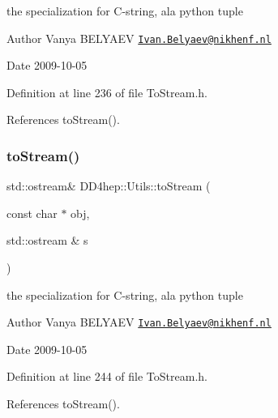 the specialization for C-\/string, a\textquotesingle{}la python tuple \begin{DoxyAuthor}{Author}
Vanya B\+E\+L\+Y\+A\+EV \href{mailto:Ivan.Belyaev@nikhenf.nl}{\tt Ivan.\+Belyaev@nikhenf.\+nl} 
\end{DoxyAuthor}
\begin{DoxyDate}{Date}
2009-\/10-\/05 
\end{DoxyDate}


Definition at line 236 of file To\+Stream.\+h.



References to\+Stream().

\hypertarget{namespace_d_d4hep_1_1_utils_a0e52adf037edd29df048973406fc2554}{}\label{namespace_d_d4hep_1_1_utils_a0e52adf037edd29df048973406fc2554} 
\subsubsection{\texorpdfstring{to\+Stream()}{toStream()}\hspace{0.1cm}{\footnotesize\ttfamily [18/22]}}
{\footnotesize\ttfamily std\+::ostream\& D\+D4hep\+::\+Utils\+::to\+Stream (\begin{DoxyParamCaption}\item[{const char $\ast$}]{obj,  }\item[{std\+::ostream \&}]{s }\end{DoxyParamCaption})\hspace{0.3cm}{\ttfamily [inline]}}

the specialization for C-\/string, a\textquotesingle{}la python tuple \begin{DoxyAuthor}{Author}
Vanya B\+E\+L\+Y\+A\+EV \href{mailto:Ivan.Belyaev@nikhenf.nl}{\tt Ivan.\+Belyaev@nikhenf.\+nl} 
\end{DoxyAuthor}
\begin{DoxyDate}{Date}
2009-\/10-\/05 
\end{DoxyDate}


Definition at line 244 of file To\+Stream.\+h.



References to\+Stream().

\hypertarget{namespace_d_d4hep_1_1_utils_ab016d8d624f13c9f5470910f2057b860}{}\label{namespace_d_d4hep_1_1_utils_ab016d8d624f13c9f5470910f2057b860} 
